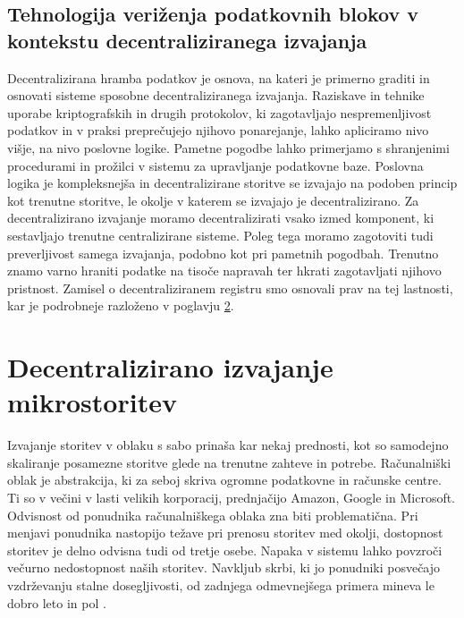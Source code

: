 \documentclass[a4paper, 12pt]{book}
\begin{document}
\section{Tehnologija veriženja podatkovnih blokov v kontekstu decentraliziranega izvajanja}
Decentralizirana hramba podatkov je osnova, na kateri je primerno graditi in osnovati sisteme sposobne decentraliziranega izvajanja.
Raziskave in tehnike uporabe kriptografskih in drugih protokolov, ki zagotavljajo nespremenljivost podatkov in v praksi preprečujejo njihovo ponarejanje, lahko apliciramo nivo višje, na nivo poslovne logike.
Pametne pogodbe lahko primerjamo s shranjenimi procedurami in prožilci v sistemu za upravljanje podatkovne baze.
Poslovna logika je kompleksnejša in decentralizirane storitve se izvajajo na podoben princip kot trenutne storitve, le okolje v katerem se izvajajo je decentralizirano.
Za decentralizirano izvajanje moramo decentralizirati vsako izmed komponent, ki sestavljajo trenutne centralizirane sisteme.
Poleg tega moramo zagotoviti tudi preverljivost samega izvajanja, podobno kot pri pametnih pogodbah.
Trenutno znamo varno hraniti podatke na tisoče napravah ter hkrati zagotavljati njihovo pristnost.
Zamisel o decentraliziranem registru smo osnovali prav na tej lastnosti, kar je podrobneje razloženo v poglavju \ref{ch4}.

\chapter{Decentralizirano izvajanje mikrostoritev}
\label{ch4}

Izvajanje storitev v oblaku s sabo prinaša kar nekaj prednosti, kot so samodejno skaliranje posamezne storitve glede na trenutne zahteve in potrebe.
Računalniški oblak je abstrakcija, ki za seboj skriva ogromne podatkovne in računske centre.
Ti so v večini v lasti velikih korporacij, prednjačijo Amazon, Google in Microsoft.
Odvisnost od ponudnika računalniškega oblaka zna biti problematična.
Pri menjavi ponudnika nastopijo težave pri prenosu storitev med okolji, dostopnost storitev je delno odvisna tudi od tretje osebe. 
Napaka v sistemu lahko povzroči večurno nedostopnost naših storitev.
Navkljub skrbi, ki jo ponudniki posvečajo vzdrževanju stalne dosegljivosti, od zadnjega odmevnejšega primera mineva le dobro leto in pol \cite{awsFail}.
\end{document}
